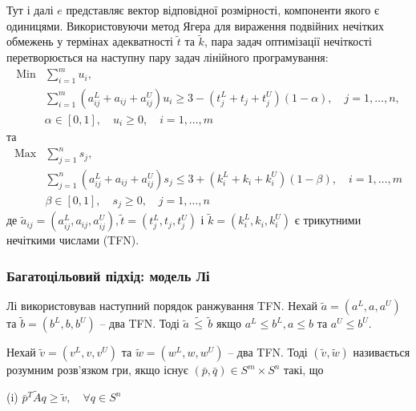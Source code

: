 \documentclass[14pt, a4paper, oneside]{extarticle}
\numberwithin{equation}{section}
\newcommand{\geqslant}{\geq}
\newcommand{\leqslant}{\leq}
\begin{document}
Тут і далі $e$ представляє вектор відповідної розмірності, компоненти якого є одиницями. Використовуючи метод Ягера для вираження подвійних нечітких обмежень у термінах адекватності $\tilde{t}$ та $\tilde{k}$, пара задач оптимізації нечіткості перетворюється на наступну пару задач лінійного програмування:
\begin{equation}
\begin{aligned}
\operatorname{Min} & \sum_{i=1}^{m} u_{i} , \\
& \sum_{i=1}^{m}\left(a_{i j}^{L}+a_{i j}+a_{i j}^{U}\right) u_{i} \geqslant 3-\left(t_{j}^{L}+t_{j}+t_{j}^{U}\right)(1-\alpha), \quad j=1, \ldots, n, \\
& \alpha \in[0,1], \quad u_{i} \geqslant 0, \quad i=1, \ldots, m
\end{aligned}
\end{equation}
та
\begin{equation}
\begin{aligned}
\operatorname{Max} & \sum_{j=1}^{n} s_{j} , \\
& \sum_{j=1}^{n}\left(a_{i j}^{L}+a_{i j}+a_{i j}^{U}\right) s_{j} \leqslant 3+\left(k_{i}^{L}+k_{i}+k_{i}^{U}\right)(1-\beta), \quad i=1, \ldots, m \\
& \beta \in[0,1], \quad s_{j} \geqslant 0, \quad j=1, \ldots, n
\end{aligned}
\end{equation}
де $\tilde{a}_{i j}=\left(a_{i j}^{L}, a_{i j}, a_{i j}^{U}\right), \tilde{t}=\left(t_{j}^{L}, t_{j}, t_{j}^{U}\right)$ і $\tilde{k}=\left(k_{i}^{L}, k_{i}, k_{i}^{U}\right)$ є трикутними нечіткими числами (TFN).
\subsubsection{Багатоцільовий підхід: модель Лі}
Лі використовував наступний порядок ранжування TFN. 
Нехай $\tilde{a}=\left(a^{L}, a, a^{U}\right)$ та $\tilde{b}=\left(b^{L}, b, b^{U}\right)$ -- два TFN.
$
\text{Тоді } \tilde{a} \,\tilde{\leqslant}\, \tilde{b} \text { якщо } a^{L} \leqslant b^{L}, a \leqslant b \text { та } a^{U}\leqslant b^{U} .
$

Нехай $\tilde{v}=\left(v^{L}, v, v^{U}\right)$ та $\tilde{w}=\left(w^{L}, w, w^{U}\right)$ -- два TFN. Тоді $(\tilde{v}, \tilde{w})$ називається розумним розв'язком гри, якщо існує $(\bar{p}, \bar{q}) \in S^{m} \times S^{n}$ такі, що

(i) $\bar{p}^{T} \tilde{A} q \geqslant \tilde{v}, \quad \forall q \in S^{n}$
\end{document}
